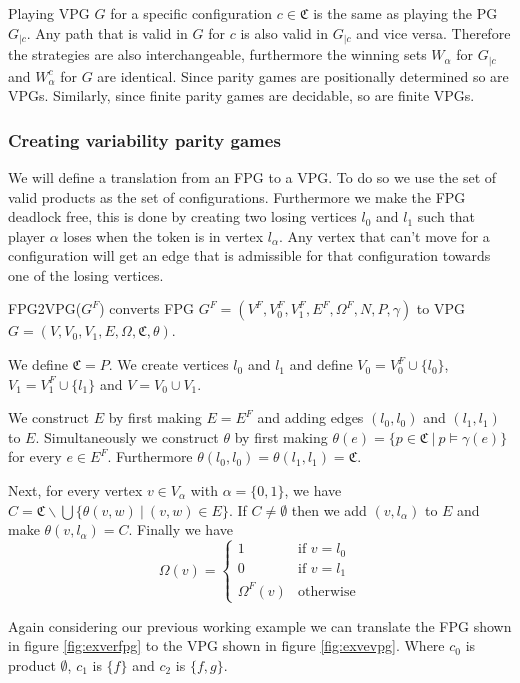 Playing VPG $G$ for a specific configuration $c \in \mathfrak{C}$ is the same as playing the PG $G_{|c}$. Any path that is valid in $G$ for $c$ is also valid in $G_{|c}$ and vice versa. Therefore the strategies are also interchangeable, furthermore the winning sets $W_\alpha$ for $G_{|c}$ and $W_\alpha^c$ for $G$ are identical. Since parity games are positionally determined so are VPGs. Similarly, since finite parity games are decidable, so are finite VPGs.
\subsubsection{Creating variability parity games}
We will define a translation from an FPG to a VPG. To do so we use the set of valid products as the set of configurations. Furthermore we make the FPG deadlock free, this is done by creating two losing vertices $l_0$ and $l_1$ such that player $\alpha$ loses when the token is in vertex $l_\alpha$. Any vertex that can't move for a configuration will get an edge that is admissible for that configuration towards one of the losing vertices.
\begin{definition}
	\label{def_FPG2VPG}
	FPG2VPG($G^F$) converts FPG $G^F = (V^F, V_0^F, V_1^F, E^F, \Omega^F, N, P, \gamma)$ to VPG $G = (V, V_0, V_1, E, \Omega, \mathfrak{C}, \theta)$.
	
	We define $\mathfrak{C} = P$. We create vertices $l_0$ and $l_1$ and define $V_0 = V_0^F \cup \{l_0\}$, $V_1 = V_1^F \cup \{l_1\}$ and $V = V_0 \cup V_1$.
	
	We construct $E$ by first making $E = E^F$ and adding edges $(l_0, l_0)$ and $(l_1, l_1)$ to $E$. Simultaneously we construct $\theta$ by first making $\theta(e) = \{p \in \mathfrak{C}\ |\ p \models \gamma(e)\}$ for every $e \in E^F$. Furthermore $\theta(l_0,l_0) = \theta(l_1,l_1) = \mathfrak{C}$.
	
	Next, for every vertex $v \in V_\alpha$ with $\alpha = \{0,1\}$, we have $C = \mathfrak{C} \backslash \bigcup \{\theta(v,w)\ |\ (v,w) \in E\}$. If $C \neq \emptyset$ then we add $(v, l_\alpha)$ to $E$ and make $\theta(v,l_\alpha) = C$.
	Finally we have 
	\[ \Omega(v) = \begin{cases}
	1  & \text{if } v = l_0 \\
	0 & \text{if } v = l_1 \\
	\Omega^F(v) &\text{otherwise}
	\end{cases} \]
\end{definition}
Again considering our previous working example we can translate the FPG shown in figure \ref{fig:exverfpg} to the VPG shown in figure \ref{fig:exvevpg}. Where $c_0$ is product $\emptyset$, $c_1$ is $\{f\}$ and $c_2$ is $\{f,g\}$.
